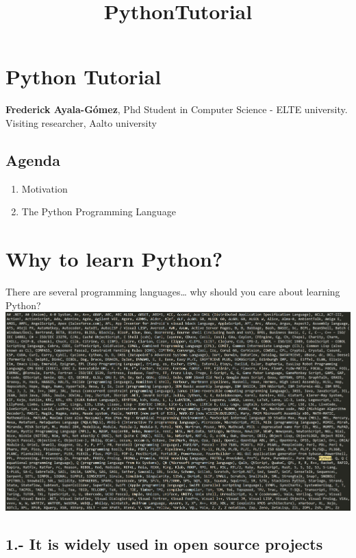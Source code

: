 \documentclass[11pt]{article}
\title{PythonTutorial}
\makeatletter
\def\maxwidth{\ifdim\Gin@nat@width>\linewidth\linewidth
    \else\Gin@nat@width\fi}
\let\Oldincludegraphics\includegraphics
\renewcommand{\includegraphics}[1]{\Oldincludegraphics[width=.8\maxwidth]{#1}}
\providecommand{\tightlist}{%
      \setlength{\itemsep}{0pt}\setlength{\parskip}{0pt}}
\makeatother
\begin{document}
    
    
    \maketitle
    
    

    
    \hypertarget{python-tutorial}{%
\section{Python Tutorial}\label{python-tutorial}}

\textbf{Frederick Ayala-Gómez}, Phd Student in Computer Science - ELTE
university. Visiting researcher, Aalto university

    \hypertarget{agenda}{%
\subsection{Agenda}\label{agenda}}

\begin{enumerate}
\def\labelenumi{\arabic{enumi}.}
\tightlist
\item
  Motivation
\item
  The Python Programming Language
\end{enumerate}

    \hypertarget{why-to-learn-python}{%
\section{Why to learn Python?}\label{why-to-learn-python}}

    There are several programming languages\ldots{} why should you care
about learning Python? \includegraphics{./img/languages.png}

    \hypertarget{it-is-widely-used-in-open-source-projects}{%
\subsection{1.- It is widely used in open source
projects}\label{it-is-widely-used-in-open-source-projects}}
\end{document}
